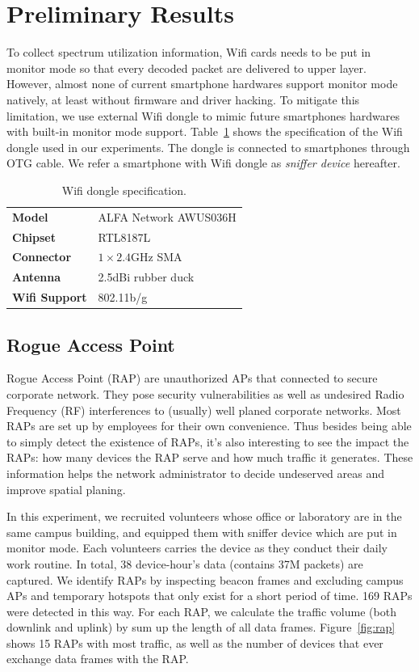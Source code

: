 \section{Preliminary Results}
\label{sec-results}

To collect spectrum utilization information, Wifi cards needs to be put in
monitor mode so that every decoded packet are delivered to upper layer.
However, almost none of current smartphone hardwares support monitor mode natively,
at least without firmware and driver hacking. To mitigate this limitation, we
use external Wifi dongle to mimic future smartphones hardwares with built-in
monitor mode support. Table~\ref{tab:dongle} shows the specification of the Wifi
dongle used in our experiments. The dongle is connected to smartphones through
OTG cable. We refer a smartphone with Wifi dongle as \textit{sniffer device}
hereafter.

\begin{table}[t!]
  \centering
  \begin{tabular}{ll}
    \toprule
    \textbf{Model} & ALFA Network AWUS036H \\
    \textbf{Chipset} & RTL8187L \\
    \textbf{Connector} & $1\times2.4$GHz SMA \\
    \textbf{Antenna} & 2.5dBi rubber duck \\
    \textbf{Wifi Support} & 802.11b/g \\
    \bottomrule
  \end{tabular}
  \caption{Wifi dongle specification.}
  \label{tab:dongle}
\end{table}


\subsection{Rogue Access Point}

Rogue Access Point (RAP) are unauthorized APs that connected to secure corporate
network. They pose security vulnerabilities as well as undesired Radio Frequency
(RF) interferences to (usually) well planed corporate networks. Most
RAPs are set up by employees for their own convenience. Thus besides being able to
simply detect the existence of RAPs, it's also interesting to see the impact the
RAPs: how many devices the RAP serve and how much traffic it
generates. These information helps the network administrator to decide
undeserved areas and improve spatial planing.

In this experiment, we recruited volunteers whose office or laboratory are in
the same campus building, and equipped them with sniffer device which are put in
monitor mode. Each volunteers carries the device as they conduct their
daily work routine. In total, 38 device-hour's data (contains 37M packets) are
captured.  We identify RAPs by inspecting beacon frames and excluding campus APs
and temporary hotspots that only exist for a short period of time. 169 RAPs were
detected in this way. For each RAP, we calculate the traffic volume (both
downlink and uplink) by sum up the length of all data frames.
Figure~\ref{fig:rap} shows 15 RAPs with most traffic, as well as the number of
devices that ever exchange data frames with the RAP.

